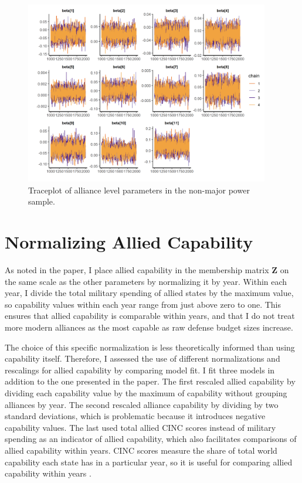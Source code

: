 \documentclass[12pt]{article}
\begin{document}
\begin{figure}[htbp]
	\centering
		\includegraphics[width=0.95\textwidth]{trace-all-min.png}
	\caption{Traceplot of alliance level parameters in the non-major power sample.}
	\label{fig:trace-all-min}
\end{figure}



\section{Normalizing Allied Capability}

As noted in the paper, I place allied capability in the membership matrix \textbf{Z} on the same scale as the other parameters by normalizing it by year. 
Within each year, I divide the total military spending of allied states by the maximum value, so capability values within each year range from just above zero to one. 
This ensures that allied capability is comparable within years, and that I do not treat more modern alliances as the most capable as raw defense budget sizes increase. 


The choice of this specific normalization is less theoretically informed than using capability itself. 
Therefore, I assessed the use of different normalizations and rescalings for allied capability by comparing model fit. 
I fit three models in addition to the one presented in the paper. 
The first rescaled allied capability by dividing each capability value by the maximum of capability without grouping alliances by year. 
The second rescaled alliance capability by dividing by two standard deviations, which is problematic because it introduces negative capability values. 
The last used total allied CINC scores instead of military spending as an indicator of allied capability, which also facilitates comparisons of allied capability within years. 
CINC scores measure the share of total world capability each state has in a particular year, so it is useful for comparing allied capability within years \citep{SingerCINC1988}. 
\end{document}
